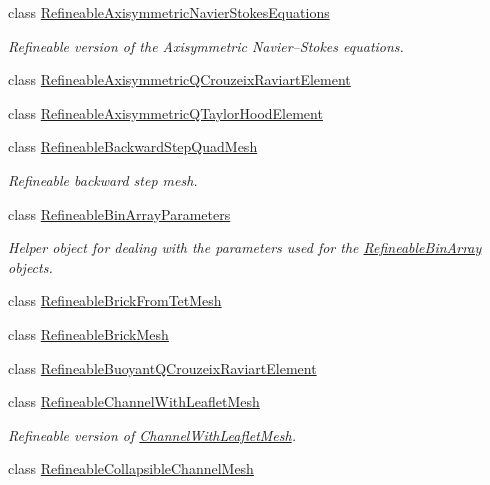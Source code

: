 \begin{DoxyCompactItemize}
class \hyperlink{classoomph_1_1RefineableAxisymmetricNavierStokesEquations}{Refineable\+Axisymmetric\+Navier\+Stokes\+Equations}
\begin{DoxyCompactList}\small\item\em Refineable version of the Axisymmetric Navier--Stokes equations. \end{DoxyCompactList}\item 
class \hyperlink{classoomph_1_1RefineableAxisymmetricQCrouzeixRaviartElement}{Refineable\+Axisymmetric\+Q\+Crouzeix\+Raviart\+Element}
\item 
class \hyperlink{classoomph_1_1RefineableAxisymmetricQTaylorHoodElement}{Refineable\+Axisymmetric\+Q\+Taylor\+Hood\+Element}
\item 
class \hyperlink{classoomph_1_1RefineableBackwardStepQuadMesh}{Refineable\+Backward\+Step\+Quad\+Mesh}
\begin{DoxyCompactList}\small\item\em Refineable backward step mesh. \end{DoxyCompactList}\item 
class \hyperlink{classoomph_1_1RefineableBinArrayParameters}{Refineable\+Bin\+Array\+Parameters}
\begin{DoxyCompactList}\small\item\em Helper object for dealing with the parameters used for the \hyperlink{classRefineableBinArray}{Refineable\+Bin\+Array} objects. \end{DoxyCompactList}\item 
class \hyperlink{classoomph_1_1RefineableBrickFromTetMesh}{Refineable\+Brick\+From\+Tet\+Mesh}
\item 
class \hyperlink{classoomph_1_1RefineableBrickMesh}{Refineable\+Brick\+Mesh}
\item 
class \hyperlink{classoomph_1_1RefineableBuoyantQCrouzeixRaviartElement}{Refineable\+Buoyant\+Q\+Crouzeix\+Raviart\+Element}
\item 
class \hyperlink{classoomph_1_1RefineableChannelWithLeafletMesh}{Refineable\+Channel\+With\+Leaflet\+Mesh}
\begin{DoxyCompactList}\small\item\em Refineable version of \hyperlink{classoomph_1_1ChannelWithLeafletMesh}{Channel\+With\+Leaflet\+Mesh}. \end{DoxyCompactList}\item 
class \hyperlink{classoomph_1_1RefineableCollapsibleChannelMesh}{Refineable\+Collapsible\+Channel\+Mesh}
\item 

\end{DoxyCompactItemize}
